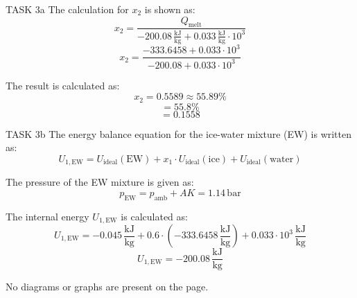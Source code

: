 TASK 3a  
The calculation for \( x_2 \) is shown as:  
\[
x_2 = \frac{Q_{\text{melt}}}{-200.08 \, \frac{\text{kJ}}{\text{kg}} + 0.033 \, \frac{\text{kJ}}{\text{kg}} \cdot 10^3}
\]  
\[
x_2 = \frac{-333.6458 + 0.033 \cdot 10^3}{-200.08 + 0.033 \cdot 10^3}
\]  

The result is calculated as:  
\[
x_2 = 0.5589 \approx 55.89\%
\]  
\[
= 55.8\%
\]  
\[
= 0.1558
\]  

TASK 3b  
The energy balance equation for the ice-water mixture (EW) is written as:  
\[
U_{1,\text{EW}} = U_{\text{ideal}}(\text{EW}) + x_1 \cdot U_{\text{ideal}}(\text{ice}) + U_{\text{ideal}}(\text{water})
\]  

The pressure of the EW mixture is given as:  
\[
p_{\text{EW}} = p_{\text{amb}} + AK = 1.14 \, \text{bar}
\]  

The internal energy \( U_{1,\text{EW}} \) is calculated as:  
\[
U_{1,\text{EW}} = -0.045 \, \frac{\text{kJ}}{\text{kg}} + 0.6 \cdot (-333.6458 \, \frac{\text{kJ}}{\text{kg}}) + 0.033 \cdot 10^3 \, \frac{\text{kJ}}{\text{kg}}
\]  
\[
U_{1,\text{EW}} = -200.08 \, \frac{\text{kJ}}{\text{kg}}
\]  

No diagrams or graphs are present on the page.